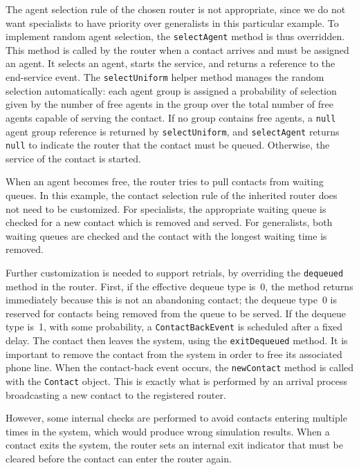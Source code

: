The agent selection rule of the chosen router is not appropriate,
since we do not want specialists to have priority over
generalists in this particular example.
To implement random agent selection, the
\texttt{select\-Agent} method is thus overridden.
This method is called by the router when a contact arrives
and must be assigned an agent.  It selects an agent, starts the
service, and returns a reference to the end-service event.
The \texttt{select\-Uniform} helper method manages the random
selection automatically:  each agent group is assigned a probability
of selection given by the number of free agents in the group over the
total number of free agents capable of serving the contact.   If no
group contains free agents, a
\texttt{null} agent group reference is returned by
\texttt{select\-Uniform}, and \texttt{select\-Agent} returns
\texttt{null} to indicate the router that the contact must be queued.
Otherwise, the service of the contact is started.

When an agent becomes free, the
router tries to pull contacts from waiting queues.  In this example,
the contact selection rule of the inherited router does not need to be
customized.  For specialists, the
appropriate waiting queue is checked for a new contact which is removed and
served.  For generalists, both waiting queues are checked and the
contact with the longest waiting time is removed.

Further customization is needed to support retrials,
by overriding the \texttt{dequeued} method in
the router.  First, if the effective dequeue type is~0, the method returns
immediately because this is not an abandoning contact; the dequeue
type~0 is reserved for contacts being removed from the queue to be
served.  If the dequeue type is~1,
with some probability, a \texttt{Contact\-Back\-Event} is
scheduled after a fixed delay.  The contact then leaves the system,
using the
\texttt{exit\-Dequeued} method.  It is important to remove the contact from
the system in order to free its associated phone line.  When the
contact-back event occurs, the \texttt{new\-Contact} method is called
with the \texttt{Contact} object.
This is exactly what is performed by an
arrival process broadcasting a new contact to the registered
router.

However, some internal checks are performed
to avoid contacts entering multiple times in the system, which would
produce wrong simulation results.  When a contact exits the system, the
router sets an internal exit indicator
that must be cleared
before the contact can enter the router again.

